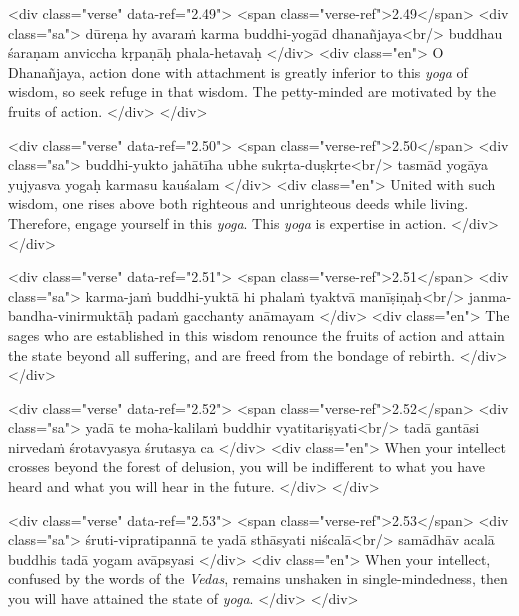 \begin{html}
<div class="verse" data-ref="2.49">
  <span class="verse-ref">2.49</span>
  <div class="sa">
    dūreṇa hy avaraṁ karma buddhi-yogād dhanañjaya<br/>
    buddhau śaraṇam anviccha kṛpaṇāḥ phala-hetavaḥ
  </div>
  <div class="en">
    O Dhanañjaya, action done with attachment is greatly inferior to this \textit{yoga} of wisdom, so seek refuge in that wisdom. The petty-minded are motivated by the fruits of action.
  </div>
</div>
\end{html}



\begin{html}
<div class="verse" data-ref="2.50">
  <span class="verse-ref">2.50</span>
  <div class="sa">
    buddhi-yukto jahātīha ubhe sukṛta-duṣkṛte<br/>
    tasmād yogāya yujyasva yogaḥ karmasu kauśalam
  </div>
  <div class="en">
    United with such wisdom, one rises above both righteous and unrighteous deeds while living. Therefore, engage yourself in this \textit{yoga}. This \textit{yoga} is expertise in action.
  </div>
</div>
\end{html}



\begin{html}
<div class="verse" data-ref="2.51">
  <span class="verse-ref">2.51</span>
  <div class="sa">
    karma-jaṁ buddhi-yuktā hi phalaṁ tyaktvā manīṣiṇaḥ<br/>
    janma-bandha-vinirmuktāḥ padaṁ gacchanty anāmayam
  </div>
  <div class="en">
    The sages who are established in this wisdom renounce the fruits of action and attain the state beyond all suffering, and are freed from the bondage of rebirth.
  </div>
</div>
\end{html}



\begin{html}
<div class="verse" data-ref="2.52">
  <span class="verse-ref">2.52</span>
  <div class="sa">
    yadā te moha-kalilaṁ buddhir vyatitariṣyati<br/>
    tadā gantāsi nirvedaṁ śrotavyasya śrutasya ca
  </div>
  <div class="en">
    When your intellect crosses beyond the forest of delusion, you will be indifferent to what you have heard and what you will hear in the future.
  </div>
</div>
\end{html}



\begin{html}
<div class="verse" data-ref="2.53">
  <span class="verse-ref">2.53</span>
  <div class="sa">
    śruti-vipratipannā te yadā sthāsyati niścalā<br/>
    samādhāv acalā buddhis tadā yogam avāpsyasi
  </div>
  <div class="en">
    When your intellect, confused by the words of the \textit{Vedas}, remains unshaken in single-mindedness, then you will have attained the state of \textit{yoga}.
  </div>
</div>
\end{html}


